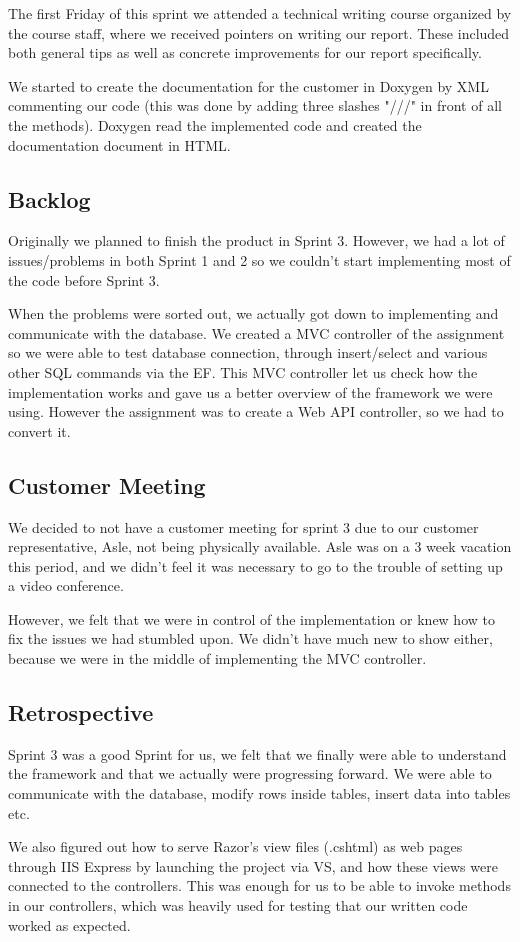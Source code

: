 The first Friday of this sprint we attended a technical writing course organized by the course staff, where we received pointers on writing our report. These included both general tips as well as concrete improvements for our report specifically.

We started to create the documentation for the customer in Doxygen by XML commenting our code (this was done by adding three slashes "///" in front of all the methods). Doxygen read the implemented code and created the documentation document in HTML. 

\subsection{Backlog}
Originally we planned to finish the product in Sprint 3. However, we had a lot of issues/problems in both Sprint 1 and 2 so we couldn't start implementing most of the code before Sprint 3.

When the problems were sorted out, we actually got down to implementing and communicate with the database. We created a MVC controller of the assignment so we were able to test database connection, through insert/select and various other SQL commands via the EF. This MVC controller let us check how the implementation works and gave us a better overview of the framework we were using. However the assignment was to create a Web API controller, so we had to convert it.

\subsection{Customer Meeting}
We decided to not have a customer meeting for sprint 3 due to our customer representative, Asle, not being physically available. Asle was on a 3 week vacation this period, and we didn't feel it was necessary to go to the trouble of setting up a video conference.

However, we felt that we were in control of the implementation or knew how to fix the issues we had stumbled upon. We didn't have much new to show either, because we were in the middle of implementing the MVC controller.

\subsection{Retrospective}
Sprint 3 was a good Sprint for us, we felt that we finally were able to understand the framework and that we actually were progressing forward. We were able to communicate with the database, modify rows inside tables, insert data into tables etc.

We also figured out how to serve Razor's view files (.cshtml) as web pages through IIS Express by launching the project via VS, and how these views were connected to the controllers. This was enough for us to be able to invoke methods in our controllers, which was heavily used for testing that our written code worked as expected.